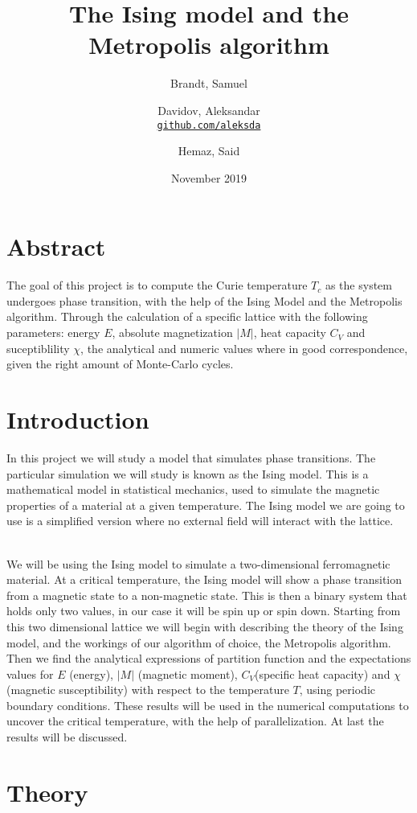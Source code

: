 \documentclass{article}
\title{The Ising model and the Metropolis algorithm}
\author{
  Brandt, Samuel\\
  \and
  Davidov, Aleksandar\\
  \textcolor{blue}{\href{https://github.com/aleksda/FYS4150/}{\texttt{github.com/aleksda}}}
  \and
  Hemaz, Said\\
}
\date{November 2019}
\begin{document}
\maketitle

\section{Abstract}

The goal of this project is to compute the Curie temperature  $T_c$ as the system undergoes phase transition, with the help of the Ising Model and the Metropolis algorithm. Through the calculation of a specific lattice with the following parameters: energy $E$, absolute magnetization  $|M|$, heat capacity   $C_V$ and suceptiblility  $\chi$, the analytical and numeric values where in good correspondence, given the right amount of Monte-Carlo cycles.
\newpage
\tableofcontents
\newpage
\section{Introduction}

In this project we will study a model that simulates phase transitions. The particular simulation we will study is known as the Ising model. This is a mathematical model in statistical mechanics, used to simulate the magnetic properties of a material at a given temperature. The Ising model we are going to use is a simplified version where no external field will interact with the lattice. \\\

We will be using the Ising model to simulate a two-dimensional ferromagnetic material. At a critical temperature, the Ising model will show a phase transition from a magnetic state to a non-magnetic state. This is then a binary system that holds only two values, in our case it will be spin up or spin down. Starting from this two dimensional lattice we will begin with describing the theory of the Ising model, and the workings of our algorithm of choice, the Metropolis algorithm. Then we find the analytical expressions of partition function and the expectations values for  $E$ (energy), $|M|$ (magnetic moment),  $C_V$(specific heat capacity) and  $\chi$ (magnetic susceptibility) with respect to the temperature $T$, using periodic boundary conditions. These results will be used in the numerical computations to uncover the critical temperature, with the help of parallelization. At last the results will be discussed.

\section{Theory}
\end{document}

